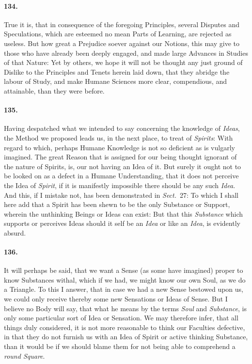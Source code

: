 \documentclass[]{article}
\newenvironment{sectionbody}{}{}
\begin{document}
\begin{sectionbody}
\paragraph{134.} True it is, that in consequence of the foregoing Principles,
several Disputes and Speculations, which are esteemed no mean
Parts of Learning, are rejected as useless.  But how great a
Prejudice soever against our Notions, this may give to those who
have already been deeply engaged, and made large Advances in
Studies of that Nature: Yet by others, we hope it will not be
thought any just ground of Dislike to the Principles and Tenets
herein laid down, that they abridge the labour of Study, and make
Humane Sciences more clear, compendious, and attainable, than
they were before.



\paragraph{135.} Having despatched what we intended to say concerning the
knowledge of \emph{Ideas}, the Method we proposed leads us, in the
next place, to treat of \emph{Spirits}: With regard to which,
perhaps Humane Knowledge is not so deficient as is vulgarly
imagined.  The great Reason that is assigned for our being
thought ignorant of the nature of Spirits, is, our not having an
Idea of it.  But surely it ought not to be looked on as a defect
in a Humane Understanding, that it does not perceive the Idea of
\emph{Spirit}, if it is manifestly impossible there should be any
such \emph{Idea}.  And this, if I mistake not, has been
demonstrated in \emph{Sect.}~27: To which I shall here add that a
Spirit has been shewn to be the only Substance or Support,
wherein the unthinking Beings or Ideas can exist: But that this
\emph{Substance} which supports or perceives Ideas should it
self be an \emph{Idea} or like an \emph{Idea}, is evidently
absurd.



\paragraph{136.} It will perhaps be said, that we want a Sense (as some have
imagined) proper to know Substances withal, which if we had, we
might know our own Soul, as we do a Triangle.  To this I answer,
that in case we had a new Sense bestowed upon us, we could only
receive thereby some new Sensations or Ideas of Sense.  But I
believe no Body will say, that what he means by the terms
\emph{Soul} and \emph{Substance}, is only some particular sort of
Idea or Sensation.  We may therefore infer, that all things duly
considered, it is not more reasonable to think our Faculties
defective, in that they do not furnish us with an Idea of Spirit
or active thinking Substance, than it would be if we should blame
them for not being able to comprehend a \emph{round Square}.




\end{sectionbody}
\end{document}

